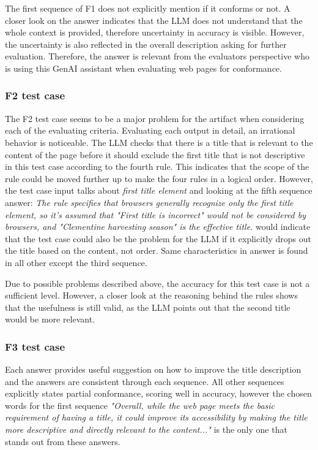 The first sequence of F1 does not explicitly mention if it conforms or not. A closer look on the answer indicates that the LLM does not understand that the whole context is provided, therefore uncertainty in accuracy is visible. However, the uncertainty is also reflected in the overall description asking for further evaluation. Therefore, the answer is relevant from the evaluators perspective who is using this GenAI assistant when evaluating web pages for conformance.

\subsubsection{F2 test case}

The F2 test case seems to be a major problem for the artifact when considering each of the evaluating criteria. Evaluating each output in detail, an irrational behavior is noticeable. The LLM checks that there is a title that is relevant to the content of the page before it should exclude the first title that is not descriptive in this test case according to the fourth rule. This indicates that the scope of the rule could be moved further up to make the four rules in a logical order. However, the test case input talks about \textit{first title element} and looking at the fifth sequence answer: \textit{The rule specifies that browsers generally recognize only the first title element, so it's assumed that "First title is incorrect" would not be considered by browsers, and "Clementine harvesting season" is the effective title.} would indicate that the test case could also be the problem for the LLM if it explicitly drops out the title based on the content, not order. Same characteristics in answer is found in all other except the third sequence.

Due to possible problems described above, the accuracy for this test case is not a sufficient level. However, a closer look at the reasoning behind the rules shows that the usefulness is still valid, as the LLM points out that the second title would be more relevant.

\subsubsection{F3 test case}

Each answer provides useful suggestion on how to improve the title description and the answers are consistent through each sequence. All other sequences explicitly states partial conformance, scoring well in accuracy, however the chosen words for the first sequence \textit{"Overall, while the web page meets the basic requirement of having a title, it could improve its accessibility by making the title more descriptive and directly relevant to the content..."} is the only one that stands out from these answers. 

